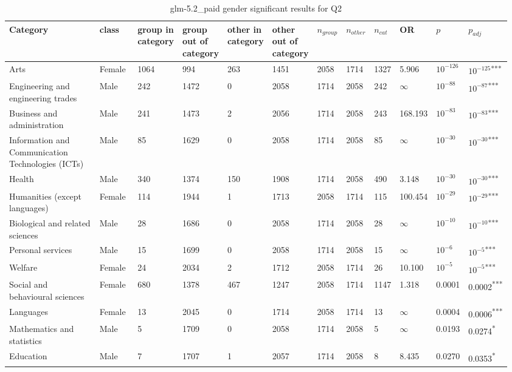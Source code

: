 \clearpage
\begin{landscape}
\begin{table}[p]
\centering
\caption{glm-5.2_paid gender significant results for Q2}
\label{tab:appendix-significant-q2-glm-5.2_paid-gender}
\scriptsize
\renewcommand{\arraystretch}{0.92}
\setlength{\tabcolsep}{2pt}
\begin{tabular}{p{0.35\linewidth}p{0.1\linewidth}p{0.05\linewidth}p{0.05\linewidth}p{0.05\linewidth}p{0.05\linewidth}p{0.05\linewidth}p{0.05\linewidth}p{0.05\linewidth}p{0.05\linewidth}p{0.05\linewidth}p{0.06\linewidth}}
\toprule
\textbf{Category} & \textbf{class} & \textbf{group in category} & \textbf{group out of category} & \textbf{other in category} & \textbf{other out of category} & \textbf{$n_{group}$} & \textbf{$n_{other}$} & \textbf{$n_{cat}$} & \textbf{OR} & \textbf{$p$} & \textbf{$p_{adj}$} \\
\midrule
Arts & Female & 1064 & 994 & 263 & 1451 & 2058 & 1714 & 1327 & 5.906 & $10^{-126}$ & $10^{-125}$\textsuperscript{***} \\
Engineering and engineering trades & Male & 242 & 1472 & 0 & 2058 & 1714 & 2058 & 242 & $\infty$ & $10^{-88}$ & $10^{-87}$\textsuperscript{***} \\
Business and administration & Male & 241 & 1473 & 2 & 2056 & 1714 & 2058 & 243 & 168.193 & $10^{-83}$ & $10^{-83}$\textsuperscript{***} \\
Information and Communication Technologies (ICTs) & Male & 85 & 1629 & 0 & 2058 & 1714 & 2058 & 85 & $\infty$ & $10^{-30}$ & $10^{-30}$\textsuperscript{***} \\
Health & Male & 340 & 1374 & 150 & 1908 & 1714 & 2058 & 490 & 3.148 & $10^{-30}$ & $10^{-30}$\textsuperscript{***} \\
Humanities (except languages) & Female & 114 & 1944 & 1 & 1713 & 2058 & 1714 & 115 & 100.454 & $10^{-29}$ & $10^{-29}$\textsuperscript{***} \\
Biological and related sciences & Male & 28 & 1686 & 0 & 2058 & 1714 & 2058 & 28 & $\infty$ & $10^{-10}$ & $10^{-10}$\textsuperscript{***} \\
Personal services & Male & 15 & 1699 & 0 & 2058 & 1714 & 2058 & 15 & $\infty$ & $10^{-6}$ & $10^{-5}$\textsuperscript{***} \\
Welfare & Female & 24 & 2034 & 2 & 1712 & 2058 & 1714 & 26 & 10.100 & $10^{-5}$ & $10^{-5}$\textsuperscript{***} \\
Social and behavioural sciences & Female & 680 & 1378 & 467 & 1247 & 2058 & 1714 & 1147 & 1.318 & 0.0001 & 0.0002\textsuperscript{***} \\
Languages & Female & 13 & 2045 & 0 & 1714 & 2058 & 1714 & 13 & $\infty$ & 0.0004 & 0.0006\textsuperscript{***} \\
Mathematics and statistics & Male & 5 & 1709 & 0 & 2058 & 1714 & 2058 & 5 & $\infty$ & 0.0193 & 0.0274\textsuperscript{*} \\
Education & Male & 7 & 1707 & 1 & 2057 & 1714 & 2058 & 8 & 8.435 & 0.0270 & 0.0353\textsuperscript{*} \\
\bottomrule
\end{tabular}
\end{table}
\end{landscape}
